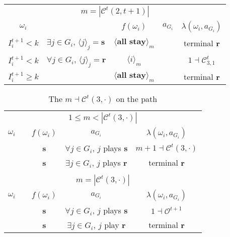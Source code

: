 \documentclass[12pt,letter]{article}
\newcommand{\Kappa}{\mathcal{C}}
\newcommand{\Omicron}{\mathcal{O}}
\theoremstyle{definition}
\theoremstyle{remark}
\theoremstyle{claim}
\begin{document}
\begin{table}[!htbp]
\begin{center}
\begin{tabular}{c l | c | c | c}
\multicolumn{5}{c}{$m= |\Kappa^t(2,t+1)|$}\\
$\omega_i$ 	 & 	   &	$f(\omega_i)$  &	$a_{G_i}$ & $\lambda(\omega_i,a_{G_i})$ \\
\hline
\hline
$I^{t+1}_i< k$  	& 	$\exists j\in G_i$, $\langle j \rangle_j=\textbf{s}$	& $\langle \textbf{all stay} \rangle_m$		&  	& terminal \textbf{r}\\
$I^{t+1}_i< k$  	& 	$\forall j\in G_i$, $\langle j \rangle_j=\textbf{r}$	& $\langle i \rangle_m$		&  	& $1\dashv \Kappa^t_{3,1}$\\
$I^{t+1}_i\geq k$	 & 				& $\langle \textbf{all stay} \rangle_m$ 	& 		& terminal \textbf{r}\\
\hline
\end{tabular}
\end{center}
\end{table}




\clearpage









\begin{table}[!htbp]
\caption{The $m\dashv\Kappa^t(3,\cdot)$ on the path}
\label{table:eqm_path_kt3}
\begin{center}
\begin{tabular}{c c | c | c | c}
\multicolumn{5}{c}{$1\leq m < |\Kappa^t(3,\cdot)|$}\\
$\omega_i$ 	 & 	   &	$f(\omega_i)$  &	$a_{G_i}$ & $\lambda(\omega_i,a_{G_i})$ \\
\hline
\hline
  	&	& \textbf{s} & $\forall j\in G_i$, $j$ plays $\textbf{s}$ 	& $m+1\dashv \Kappa^t(3,\cdot)$\\
  	&  & \textbf{s}  &  $\exists j\in G_i$, $j$ plays $\textbf{r}$  	& terminal \textbf{r}\\
\hline
\\
\multicolumn{5}{c}{$m= |\Kappa^t(3,\cdot)|$}\\
$\omega_i$ 	 & 	   &	$f(\omega_i)$  &	$a_{G_i}$ & $\lambda(\omega_i,a_{G_i})$ \\
\hline
\hline
 	& 	& \textbf{s} & $\forall j\in G_i$, $j$ plays $\textbf{s}$ 	& $1\dashv \Omicron^{t+1}$\\
  	&  & \textbf{s}  &  $\exists j\in G_i$, $j$ play $\textbf{r}$  	& terminal \textbf{r}\\
\hline
\end{tabular}
\end{center}
\end{table}
\end{document}
